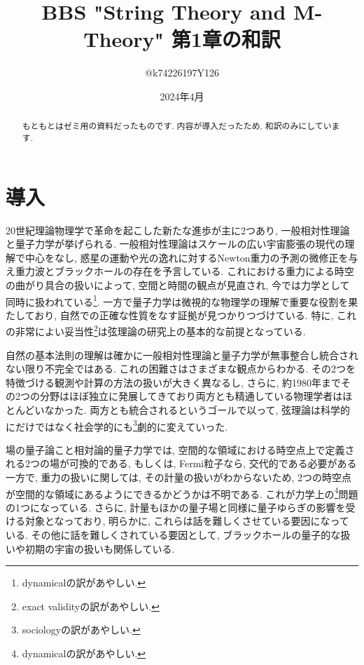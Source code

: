 \documentclass[10pt,a4paper]{jsarticle}
\title{BBS "String Theory and M-Theory" 第1章の和訳}
\author{@k74226197Y126}
\date{2024年4月}
\begin{document}
\maketitle
\begin{abstract}
    もともとはゼミ用の資料だったものです. 内容が導入だったため, 和訳のみにしています. 
\end{abstract}
\section{導入}
20世紀理論物理学で革命を起こした新たな進歩が主に2つあり, 一般相対性理論と量子力学が挙げられる. 一般相対性理論はスケールの広い宇宙膨張の現代の理解で中心をなし, 惑星の運動や光の逸れに対するNewton重力の予測の微修正を与え重力波とブラックホールの存在を予言している. これにおける重力による時空の曲がり具合の扱いによって, 空間と時間の観点が見直され, 今では力学として同時に扱われている\footnote{dynamicalの訳があやしい. }. 一方で量子力学は微視的な物理学の理解で重要な役割を果たしており, 自然での正確な性質をなす証拠が見つかりつづけている. 特に, これの非常によい妥当性\footnote{exact validityの訳があやしい. }は弦理論の研究上の基本的な前提となっている. \par
自然の基本法則の理解は確かに一般相対性理論と量子力学が無事整合し統合されない限り不完全ではある. これの困難さはさまざまな観点からわかる. その2つを特徴づける観測や計算の方法の扱いが大きく異なるし, さらに, 約1980年までその2つの分野はほぼ独立に発展してきており両方とも精通している物理学者はほとんどいなかった. 両方とも統合されるというゴールで以って, 弦理論は科学的にだけではなく社会学的にも\footnote{sociologyの訳があやしい. }劇的に変えていった. \par
場の量子論こと相対論的量子力学では, 空間的な領域における時空点上で定義される2つの場が可換的である, もしくは, Fermi粒子なら, 交代的である必要がある一方で, 重力の扱いに関しては, その計量の扱いがわからないため, 2つの時空点が空間的な領域にあるようにできるかどうかは不明である. これが力学上の\footnote{dynamicalの訳があやしい. }問題の1つになっている. さらに, 計量もほかの量子場と同様に量子ゆらぎの影響を受ける対象となっており, 明らかに, これらは話を難しくさせている要因になっている. その他に話を難しくされている要因として, ブラックホールの量子的な扱いや初期の宇宙の扱いも関係している. \par
\end{document}
